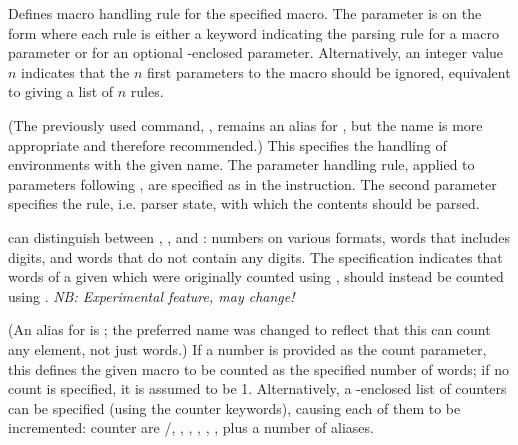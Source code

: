 
\begin{description}
\sloppy

Defines macro handling rule for the specified macro. The parameter is on the form  where each rule is either a keyword indicating the parsing rule for a macro parameter or  for an optional \code{[]}-enclosed parameter. Alternatively, an integer value $n$ indicates that the $n$ first parameters to the macro should be ignored, equivalent to giving a list of $n$  rules.

(The previously used command, , remains an alias for , but the name  is more appropriate and therefore recommended.)
This specifies the handling of environments with the given name. The parameter handling rule, applied to parameters following , are specified as in the  instruction. The second parameter specifies the rule, i.e. parser state, with which the contents should be parsed.

\TeXcount can distinguish between , , and : numbers on various formats, words that includes digits, and words that do not contain any digits.
The  specification indicates that words of a given  which were originally counted using , should instead be counted using .
\textit{NB: Experimental feature, may change!}

(An alias for  is ; the preferred name was changed to reflect that this can count any element, not just words.)
If a number is provided as the count parameter, this defines the given macro to be counted as the specified number of words; if no count is specified, it is assumed to be 1. Alternatively, a \code{[]}-enclosed list of counters can be specified (using the counter keywords), causing each of them to be incremented: counter are /, , , , , ,  plus a number of aliases.


\end{description}
